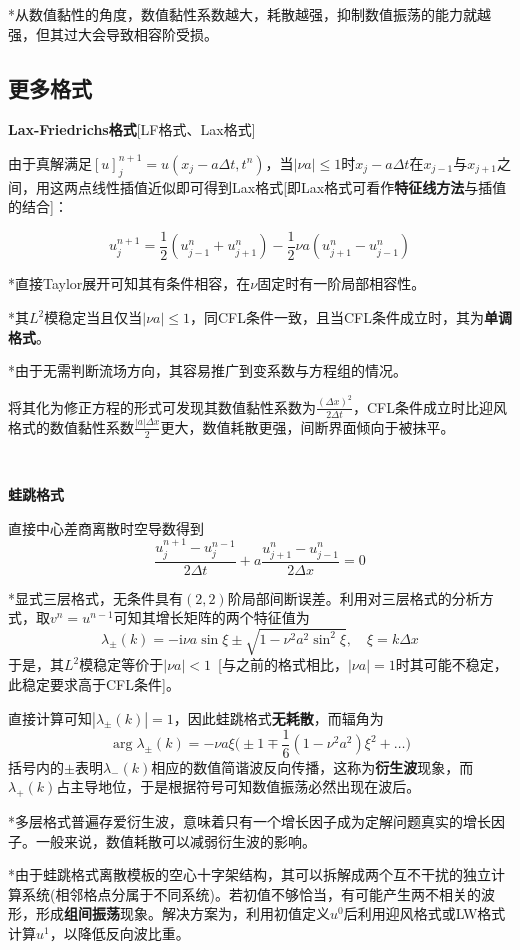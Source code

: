 \documentclass[a4paper,UTF8,fontset=windows]{ctexart}
\begin{document}
*从数值黏性的角度，数值黏性系数越大，耗散越强，抑制数值振荡的能力就越强，但其过大会导致相容阶受损。

\subsection{更多格式}
\textbf{Lax-Friedrichs格式}[LF格式、Lax格式]

由于真解满足$[u]_j^{n+1}=u(x_j-a\Delta t,t^n)$，当$|\nu a|\le1$时$x_j-a\Delta t$在$x_{j-1}$与$x_{j+1}$之间，用这两点线性插值近似即可得到Lax格式[即Lax格式可看作\textbf{特征线方法}与插值的结合]：

$$u_j^{n+1}=\frac{1}{2}(u_{j-1}^n+u_{j+1}^n)-\frac{1}{2}\nu a(u_{j+1}^n-u_{j-1}^n)$$

*直接Taylor展开可知其有条件相容，在$\nu$固定时有一阶局部相容性。

*其$L^2$模稳定当且仅当$|\nu a|\le1$，同CFL条件一致，且当CFL条件成立时，其为\textbf{单调格式}。

*由于无需判断流场方向，其容易推广到变系数与方程组的情况。

将其化为修正方程的形式可发现其数值黏性系数为$\frac{(\Delta x)^2}{2\Delta t}$，CFL条件成立时比迎风格式的数值黏性系数$\frac{|a|\Delta x}{2}$更大，数值耗散更强，间断界面倾向于被抹平。

\

\textbf{蛙跳格式}

直接中心差商离散时空导数得到
$$\frac{u_j^{n+1}-u_j^{n-1}}{2\Delta t}+a\frac{u_{j+1}^n-u_{j-1}^n}{2\Delta x}=0$$

*显式三层格式，无条件具有$(2,2)$阶局部间断误差。利用对三层格式的分析方式，取$v^n=u^{n-1}$可知其增长矩阵的两个特征值为
$$\lambda_\pm(k)=-\mathrm{i}\nu a\sin\xi\pm\sqrt{1-\nu^2a^2\sin^2\xi},\quad\xi=k\Delta x$$
于是，其$L^2$模稳定等价于$|\nu a|<1$\ [与之前的格式相比，$|\nu a|=1$时其可能不稳定，此稳定要求高于CFL条件]。

直接计算可知$|\lambda_\pm(k)|=1$，因此蛙跳格式\textbf{无耗散}，而辐角为
$$\arg\lambda_\pm(k)=-\nu a\xi\bigg(\pm1\mp\frac{1}{6}(1-\nu^2a^2)\xi^2+\dots\bigg)$$
括号内的$\pm$表明$\lambda_-(k)$相应的数值简谐波反向传播，这称为\textbf{衍生波}现象，而$\lambda_+(k)$占主导地位，于是根据符号可知数值振荡必然出现在波后。

*多层格式普遍存爱衍生波，意味着只有一个增长因子成为定解问题真实的增长因子。一般来说，数值耗散可以减弱衍生波的影响。

*由于蛙跳格式离散模板的空心十字架结构，其可以拆解成两个互不干扰的独立计算系统(相邻格点分属于不同系统)。若初值不够恰当，有可能产生两不相关的波形，形成\textbf{组间振荡}现象。解决方案为，利用初值定义$u^0$后利用迎风格式或LW格式计算$u^1$，以降低反向波比重。
\end{document}
